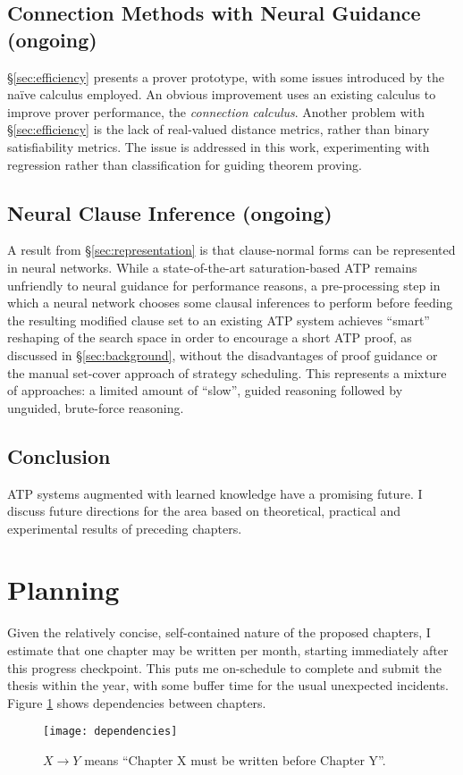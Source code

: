 \documentclass[a4paper]{article}
\begin{document}
\subsection{Connection Methods with Neural Guidance (ongoing)}
\label{sec:distance}
\S\ref{sec:efficiency} presents a prover prototype, with some issues introduced by the na\"ive calculus employed.
An obvious improvement uses an existing calculus to improve prover performance, the \emph{connection calculus}.
Another problem with \S\ref{sec:efficiency} is the lack of real-valued distance metrics, rather than binary satisfiability metrics.
The issue is addressed in this work, experimenting with regression rather than classification for guiding theorem proving.

\subsection{Neural Clause Inference (ongoing)}
\label{sec:clauses}
A result from \S\ref{sec:representation} is that clause-normal forms can be represented in neural networks.
While a state-of-the-art saturation-based ATP remains unfriendly to neural guidance for performance reasons, a pre-processing step in which a neural network chooses some clausal inferences to perform before feeding the resulting modified clause set to an existing ATP system achieves ``smart'' reshaping of the search space in order to encourage a short ATP proof, as discussed in \S\ref{sec:background}, without the disadvantages of proof guidance or the manual set-cover approach of strategy scheduling.
This represents a mixture of approaches: a limited amount of ``slow'', guided reasoning followed by unguided, brute-force reasoning.

\subsection{Conclusion}
ATP systems augmented with learned knowledge have a promising future.
I discuss future directions for the area based on theoretical, practical and experimental results of preceding chapters.

\section{Planning}
Given the relatively concise, self-contained nature of the proposed chapters, I estimate that one chapter may be written per month, starting immediately after this progress checkpoint.
This puts me on-schedule to complete and submit the thesis within the year, with some buffer time for the usual unexpected incidents.
Figure \ref{fig:deps} shows dependencies between chapters.
\begin{figure}
	\centering
	\texttt{[image: dependencies]}
	\caption{\(X \rightarrow Y\) means ``Chapter X must be written before Chapter Y''.}
	\label{fig:deps}
\end{figure}

\printbibliography
\end{document}
